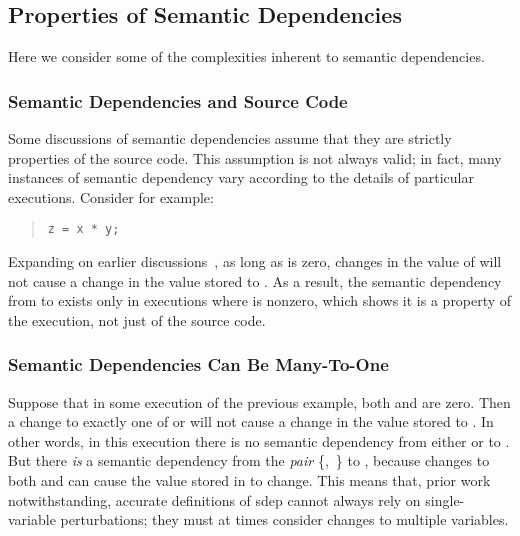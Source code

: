 \subsection{Properties of Semantic Dependencies}
\label{sec:Properties of Semantic Dependencies}

Here we consider some of the complexities inherent to semantic
dependencies.

\subsubsection{Semantic Dependencies and Source Code}
\label{sec:Semantic Dependencies and Source Code}

Some discussions of semantic dependencies assume that they
are strictly properties of the source code.
This assumption is not always valid; in fact, many
instances of semantic dependency vary according to the details of
particular executions.
Consider for example:
\begin{quote}
\begin{verbatim}
z = x * y;
\end{verbatim}
\end{quote}

Expanding on earlier discussions~\cite{Boehm:2014:OGA:2618128.2618134},
as long as  is zero, changes in the
value of  will not cause a change in the value stored to .
As a result, the semantic dependency from  to  exists only
in executions where  is nonzero,
which shows it is a property of the execution, not just of the source code.

\subsubsection{Semantic Dependencies Can Be Many-To-One}
\label{sec:Semantic Dependencies Can Be Many-To-One}

Suppose that in some execution of the previous example,
both  and  are zero.
Then a change to exactly one of  or 
will not cause a change in the value stored to .
In other words, in this execution there is no semantic dependency
from either  or  to .
But there \emph{is} a semantic dependency from the \emph{pair}
\{,~\} to ,
because changes to both  and 
can cause the value stored in  to change.
This means that, prior work~\cite{PaulEMcKenney2016OOTA}
notwithstanding, accurate definitions of sdep cannot always rely on
single-variable perturbations;
they must at times consider changes to multiple variables.

